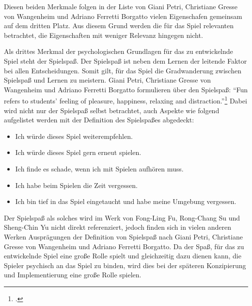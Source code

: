 	Diesen beiden Merkmale folgen in der Liste von Giani Petri, Christiane Gresse von Wangenheim und Adriano Ferretti Borgatto vielen Eigenschafen gemeinsam auf dem dritten Platz. Aus diesem Grund werden die für das Spiel relevanten betrachtet, die Eigenschaften mit weniger Relevanz hingegen nicht.

	Als drittes Merkmal der psychologischen Grundlagen für das zu entwickelnde Spiel steht der Spielspaß. Der Spielspaß ist neben dem Lernen der leitende Faktor bei allen Entscheidungen. Somit gilt, für das Spiel die Gradwanderung zwischen Spielspaß und Lernen zu meistern.
	Giani Petri, Christiane Gresse von Wangenheim und Adriano Ferretti Borgatto formulieren über den Spielspaß:
	\enquote{Fun refers to students' feeling of pleasure, happiness, relaxing and distraction.}\footcite{psych3}
	Dabei wird nicht nur der Spielspaß selbst betrachtet, auch Aspekte wie folgend aufgelistet werden mit der Definition des Spielspaßes abgedeckt:
	\begin{itemize}
		\item{Ich würde dieses Spiel weiterempfehlen.}
		\item{Ich würde dieses Spiel gern erneut spielen.}
		\item{Ich finde es schade, wenn ich mit Spielen aufhören muss.}
		\item{Ich habe beim Spielen die Zeit vergessen.}
		\item{Ich bin tief in das Spiel eingetaucht und habe meine Umgebung vergessen.}
	\end{itemize}
	Der Spielspaß als solches wird im Werk von Fong-Ling Fu, Rong-Chang Su und Sheng-Chin Yu nicht direkt referenziert, jedoch finden sich in vielen anderen Werken Ausprägungen der Definition von Spielspaß nach Giani Petri, Christiane Gresse von Wangenheim und Adriano Ferretti Borgatto.
	Da der Spaß, für das zu entwickelnde Spiel eine große Rolle spielt und gleichzeitig dazu dienen kann, die Spieler psychisch an das Spiel zu binden, wird dies bei der späteren Konzipierung und Implementierung eine große Rolle spielen.

